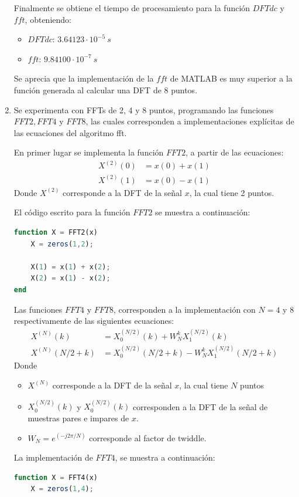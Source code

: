 \begin{enumerate}
Finalmente se obtiene el tiempo de procesamiento para la función $DFTdc$ y $fft$, obteniendo:
\begin{itemize}
    \item $DFTdc$: $3.64123\cdot 10^{-5}~s$ 
    \item $fft$:   $9.84100\cdot 10^{-7}~s$
\end{itemize}
Se aprecia que la implementación de la $fft$ de MATLAB es muy superior a la función generada al calcular una DFT de 8 puntos.

\item Se experimenta con FFTs de 2, 4 y 8 puntos, programando las funciones $FFT2, FFT4$ y $FFT8$, las cuales corresponden a implementaciones explícitas de las ecuaciones del algoritmo fft.

En primer lugar se implementa la función $FFT2$, a partir de las ecuaciones:
\begin{align*}
    X^{(2)}(0) &= x(0) + x(1)\\
    X^{(2)}(1) &= x(0) - x(1)
\end{align*}
Donde $X^{(2)}$ corresponde a la DFT de la señal $x$, la cual tiene 2 puntos.

El código escrito para la función $FFT2$ se muestra a continuación:
\begin{lstlisting}[language = octave]
function X = FFT2(x)
    X = zeros(1,2);
    
    X(1) = x(1) + x(2);
    X(2) = x(1) - x(2);
end
\end{lstlisting}

Las funciones $FFT4$ y $FFT8$, corresponden a la implementación con $N=4$ y $8$ respectivamente de las siguientes ecuaciones:
\begin{align*}
    X^{(N)}(k)   &= X_0^{(N/2)}(k) + W^k_N X_1^{(N/2)}(k)\\
    X^{(N)}(N/2+k) &= X_0^{(N/2)}(N/2+k) - W^k_N X_1^{(N/2)}(N/2+k)
\end{align*}
Donde
\begin{itemize}
    \item $X^{(N)}$ corresponde a la DFT de la señal $x$, la cual tiene $N$ puntos 
    \item $X_0^{(N/2)}(k)$ y $X_0^{(N/2)}(k)$ corresponden a la DFT de la señal de muestras pares e impares de $x$.
    \item $W_N = e^{(-j2\pi/N)}$ corresponde al factor de twiddle.
\end{itemize}

La implementación de $FFT4$, se muestra a continuación:
\begin{lstlisting}[language = octave]
function X = FFT4(x)
    X = zeros(1,4);
    

\end{lstlisting}
\end{enumerate}
